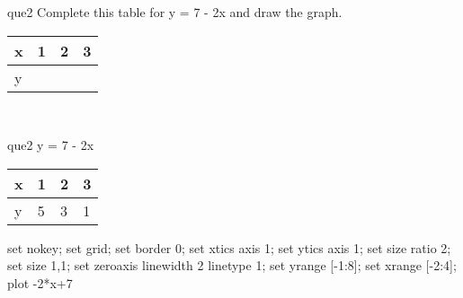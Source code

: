 \documentclass[13.5pt, varwidth=true]{beamer}
\begin{document}
\begin{frame}[shrink=19,fragile]
	\begin{beamercolorbox}[rounded=true, left, shadow=true,wd=14.8cm]{que2}
		 Complete this table for y = 7 - 2x and draw the graph. \\[0.3cm] \renewcommand{\arraystretch}{1.2}\begin{tabular}{|C|C|C|C|} \hline x & 1 & 2 & 3 \\ \hline y & & & \\ \hline \end{tabular}\\[0.3cm]
	\end{beamercolorbox}
\end{frame}
\begin{frame}[shrink=19,fragile]
	\begin{beamercolorbox}[rounded=true, left, shadow=true,wd=14.8cm]{que2}
		y = 7 - 2x\renewcommand{\arraystretch}{1.2}\begin{tabular}{|C|C|C|C|} \hline x & 1 & 2 & 3 \\ \hline y & 5 & 3 & 1\\ \hline \end{tabular}\begin{gnuplot}[terminal=pdf] set nokey; set grid; set border 0; set xtics axis 1; set ytics axis 1; set size ratio 2; set size 1,1; set zeroaxis linewidth 2 linetype 1; set yrange [-1:8]; set xrange [-2:4]; plot -2*x+7 \end{gnuplot}
	\end{beamercolorbox}
\end{frame}
\end{document}

